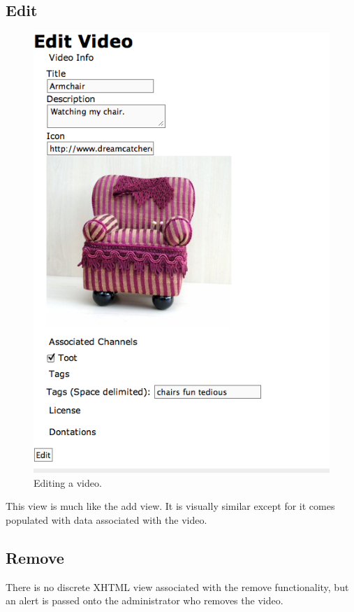 \documentclass[a4paper,12pt]{report}
\begin{document}
\subsection{Edit}
\begin{figure}[h]
\begin{center}
\includegraphics[width=150mm]{./images/videoedit.png}
\end{center}
\caption{Editing a video.}
\end{figure}

This view is much like the add view. It is visually similar except for it comes populated with data associated with the video.

\subsection{Remove}
There is no discrete XHTML view associated with the remove functionality, but an alert is passed onto the administrator who removes the video.
\end{document}
